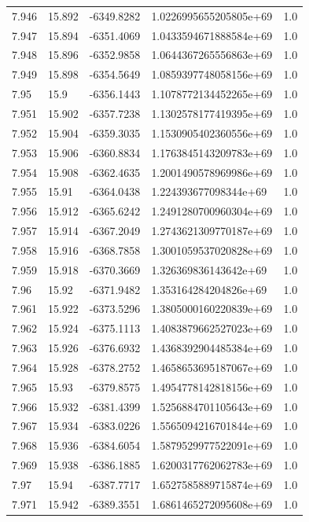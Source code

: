 \begin{tabular}{lllll}
7.946 & 15.892 & -6349.8282 & 1.0226995655205805e+69 & 1.0 \\
7.947 & 15.894 & -6351.4069 & 1.0433594671888584e+69 & 1.0 \\
7.948 & 15.896 & -6352.9858 & 1.0644367265556863e+69 & 1.0 \\
7.949 & 15.898 & -6354.5649 & 1.0859397748058156e+69 & 1.0 \\
7.95 & 15.9 & -6356.1443 & 1.1078772134452265e+69 & 1.0 \\
7.951 & 15.902 & -6357.7238 & 1.1302578177419395e+69 & 1.0 \\
7.952 & 15.904 & -6359.3035 & 1.1530905402360556e+69 & 1.0 \\
7.953 & 15.906 & -6360.8834 & 1.1763845143209783e+69 & 1.0 \\
7.954 & 15.908 & -6362.4635 & 1.2001490578969986e+69 & 1.0 \\
7.955 & 15.91 & -6364.0438 & 1.224393677098344e+69 & 1.0 \\
7.956 & 15.912 & -6365.6242 & 1.2491280700960304e+69 & 1.0 \\
7.957 & 15.914 & -6367.2049 & 1.2743621309770187e+69 & 1.0 \\
7.958 & 15.916 & -6368.7858 & 1.3001059537020828e+69 & 1.0 \\
7.959 & 15.918 & -6370.3669 & 1.326369836143642e+69 & 1.0 \\
7.96 & 15.92 & -6371.9482 & 1.353164284204826e+69 & 1.0 \\
7.961 & 15.922 & -6373.5296 & 1.3805000160220839e+69 & 1.0 \\
7.962 & 15.924 & -6375.1113 & 1.4083879662527023e+69 & 1.0 \\
7.963 & 15.926 & -6376.6932 & 1.4368392904485384e+69 & 1.0 \\
7.964 & 15.928 & -6378.2752 & 1.4658653695187067e+69 & 1.0 \\
7.965 & 15.93 & -6379.8575 & 1.4954778142818156e+69 & 1.0 \\
7.966 & 15.932 & -6381.4399 & 1.5256884701105643e+69 & 1.0 \\
7.967 & 15.934 & -6383.0226 & 1.5565094216701844e+69 & 1.0 \\
7.968 & 15.936 & -6384.6054 & 1.5879529977522091e+69 & 1.0 \\
7.969 & 15.938 & -6386.1885 & 1.6200317762062783e+69 & 1.0 \\
7.97 & 15.94 & -6387.7717 & 1.6527585889715874e+69 & 1.0 \\
7.971 & 15.942 & -6389.3551 & 1.6861465272095608e+69 & 1.0 \\

\end{tabular}
